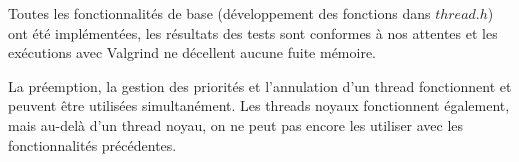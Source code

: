 Toutes les fonctionnalités de base (développement des fonctions dans $thread.h$) ont été implémentées, les résultats des tests sont conformes à nos attentes et les exécutions avec Valgrind ne décellent aucune fuite mémoire. 

La préemption, la gestion des priorités et l'annulation d'un thread fonctionnent et peuvent être utilisées simultanément. Les threads noyaux fonctionnent également, mais au-delà d'un thread noyau, on ne peut pas encore les utiliser avec les fonctionnalités précédentes.

